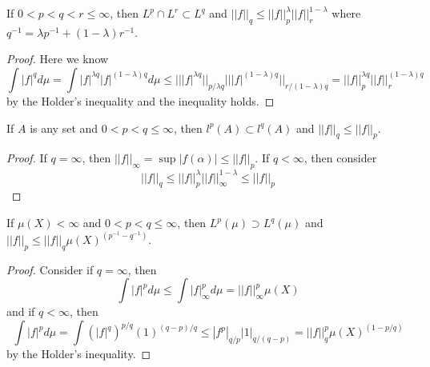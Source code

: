 \begin{proposition}
    If $0 < p < q < r \leq \infty$, then $L^p\cap L^r \subset L^q$ and $||f||_q \leq ||f||_p^{\lambda}||f||_r^{1-\lambda}$ where $q^{-1} = \lambda p^{-1}+(1-\lambda)r^{-1}$.
\end{proposition}
\begin{proof}\par
    Here we know
    \[
    \int |f|^q d\mu = \int |f|^{\lambda q}|f|^{(1-\lambda)q} d\mu \leq |||f|^{\lambda q}||_{p/\lambda q}|||f|^{(1-\lambda)q}||_{r/(1-\lambda)q} = ||f||_p^{\lambda q}||f||_r^{(1-\lambda)q}
    \]
    by the Holder's inequality and the inequality holds.\par
\end{proof}

\begin{proposition}
    If $A$ is any set and $0 < p < q \leq \infty$, then $l^p(A) \subset l^q(A)$ and $||f||_q \leq ||f||_p$.    
\end{proposition}
\begin{proof}
    If $q = \infty$, then $||f||_{\infty} = \sup |f(\alpha)| \leq ||f||_p$. If $q < \infty$, then consider
    \[
    ||f||_q \leq ||f||_p^{\lambda}||f||_{\infty}^{1-\lambda} \leq ||f||_p
    \]
\end{proof}

\begin{proposition}
    If $\mu(X)<\infty$ and $0<p<q\leq \infty$, then $L^p(\mu) \supset L^q(\mu)$ and $||f||_p \leq ||f||_q\mu(X)^{(p^{-1}-q^{-1})}$.
\end{proposition}
\begin{proof}\par
    Consider if $q =\infty$, then
    \[
    \int |f|^p d\mu \leq \int |f|_{\infty}^p d\mu = ||f||_{\infty}^p \mu(X)
    \]
    and if $q<\infty$, then
    \[
    \int |f|^p d\mu = \int (|f|^{q})^{p/q}(1)^{(q-p)/q} \leq |f^p|_{q/p}|1|_{q/(q-p)} = ||f||_q^p \mu(X)^{(1-p/q)}
    \]
    by the Holder's inequality.
\end{proof}

